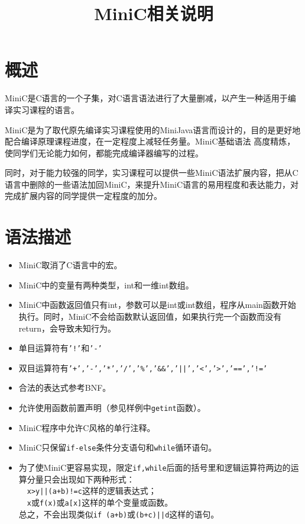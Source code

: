 \documentclass{ctexart}
\title{MiniC相关说明}
\date{}
\author{}
\begin{document}
\maketitle

\section{概述}
MiniC是C语言的一个子集，对C语言语法进行了大量删减，以产生一种适用于编译实习课程的语言。

MiniC是为了取代原先编译实习课程使用的MiniJava语言而设计的，目的是更好地配合编译原理课程进度，在一定程度上减轻任务量。MiniC基础语法%
高度精炼，使同学们无论能力如何，都能完成编译器编写的过程。

同时，对于能力较强的同学，实习课程可以提供一些MiniC语法扩展内容，把从C语言中删除的一些语法加回MiniC，来提升MiniC语言的易用程度和表达能力，对完成扩展内容的同学提供一定程度的加分。

\section{语法描述}
\begin{itemize}
\item 
MiniC取消了C语言中的宏。%
\item 
MiniC中的变量有两种类型，int和一维int数组。%
\item
MiniC中函数返回值只有int，参数可以是int或int数组，程序从main函数开始执行。同时，MiniC不会给函数默认返回值，如果执行完一个函数而没有return，会导致未知行为。

\item 
单目运算符有\texttt{'!'}和\texttt{'-'}
\item
双目运算符有\texttt{'+','-','*','/','\%','\&\&','||','\textless','\textgreater','==','!='}
\item
合法的表达式参考BNF。
\item 
允许使用函数前置声明（参见样例中\texttt{getint}函数）。
\item 
MiniC程序中允许C风格的单行注释。%
\item 
MiniC只保留\texttt{if-else}条件分支语句和\texttt{while}循环语句。
\item 
为了使MiniC更容易实现，限定\texttt{if,while}后面的括号里和逻辑运算符两边的运算分量只会出现如下两种形式：\\
\indent\ \ \texttt{x>y||(a+b)!=c}这样的逻辑表达式；\\
\indent\ \ \texttt{x}或\texttt{f(x)}或\texttt{a[x]}这样的单个变量或函数。\\
\indent 总之，不会出现类似\texttt{if (a+b)}或\texttt{(b+c)||d}这样的语句。
\end{itemize}
\newpage
\end{document}
